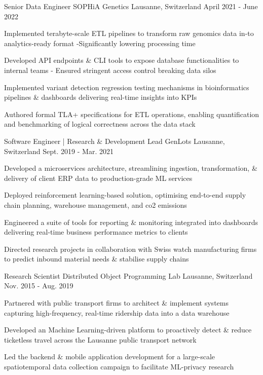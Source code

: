 \begin{cventries}
	
 \cventry
    {Senior Data Engineer} %
    {SOPHiA Genetics} %
    {Lausanne, Switzerland} %
    {April 2021 - June 2022} %
    {
      \begin{cvitems} %
        \item {Implemented terabyte-scale ETL pipelines to transform raw genomics data in-to analytics-ready format -Significantly lowering processing time}
        \item {Developed API endpoints \& CLI tools to expose database functionalities to internal teams - Ensured stringent access control breaking data silos}
        \item {Implemented variant detection regression testing mechanisms in bioinformatics pipelines \& dashboards delivering real-time insights into KPIs}
        \item {Authored formal TLA+ specifications for ETL operations, enabling quantification and benchmarking of logical correctness across the data stack}
      \end{cvitems}
    }

  \cventry
    {Software Engineer | Research \& Development Lead} %
    {GenLots} %
    {Lausanne, Switzerland} %
    {Sept. 2019 - Mar. 2021} %
    {
      \begin{cvitems} %
        \item {Developed a microservices architecture, streamlining ingestion, transformation, \& delivery of client ERP data to production-grade ML services}
      	\item {Deployed reinforcement learning-based solution, optimising end-to-end supply chain planning, warehouse management, and co2 emissions}
        \item {Engineered a suite of tools for reporting \& monitoring integrated into dashboards delivering real-time business performance metrics to clients}
        \item {Directed research projects in collaboration with Swiss watch manufacturing firms to predict inbound material needs \& stabilise supply chains}
      \end{cvitems}
    } 
   

  \cventry
    {Research Scientist} %
    {Distributed Object Programming Lab} %
    {Lausanne, Switzerland} %
    {Nov. 2015 - Aug. 2019} %
    {
      \begin{cvitems} %
      	\item {Partnered with public transport firms to architect \& implement systems capturing high-frequency, real-time ridership data into a data warehouse}
      	\item {Developed an Machine Learning-driven platform to proactively detect \& reduce ticketless travel across the Lausanne public transport network}
        \item {Led the backend \& mobile application development for a large-scale spatiotemporal data collection campaign to facilitate ML-privacy research}
      \end{cvitems}
    }



\end{cventries}
